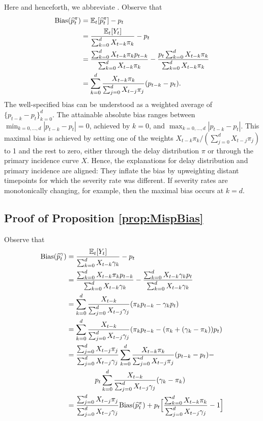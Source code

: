 \documentclass{article}
\renewcommand{\hat}{\widehat} %
\newcommand{\given}{\, \vert \,}
\begin{document}
Here and henceforth, we abbreviate \smash{$\E_t[\cdot] = \E[\cdot \given
  \{X_s\}_{s\leq t}]$}. Observe that
    \begin{align*}%
    \text{Bias}(\hat{p}_t^\pi) &= \E_t[\hat{p}_t^\pi] - p_t \\
    &= \frac{\E_t[Y_t]}{\sum_{k=0}^d X_{t-k}\pi_k} - p_t \\ 
    &= \frac{\sum_{k=0}^d X_{t-k}\pi_k p_{t-k}}{\sum_{k=0}^d X_{t-k}\pi_k} - \frac{p_t \sum_{k=0}^d X_{t-k}\pi_k}{\sum_{k=0}^d X_{t-k}\pi_k}\\
    &= \sum_{k=0}^d \frac{X_{t-k}\pi_k}{\sum_{j=0}^d X_{t-j}\pi_j} (p_{t-k}-p_t).
\end{align*}
The well-specified bias can be understood as a weighted average of $\{p_{t-k}-p_t\}_{k=0}^d$. The attainable absolute bias ranges between $\min_{k=0, \dotsc, d} |p_{t-k}-p_t| = 0$, achieved by $k=0$, and $\max_{k=0, \dotsc, d} |p_{t-k}-p_t|$. This maximal bias is achieved by setting one of the weights
$X_{t-k}\pi_k/(\sum_{j=0}^d X_{t-j}\pi_j)$ to 1 and the rest to zero,
either through the delay distribution $\pi$ or through the primary incidence curve $X$. Hence, the explanations for delay distribution and primary incidence are aligned: They inflate the bias by upweighting distant timepoints for which the severity rate was different. If severity rates are monotonically changing, for example, then the maximal bias occurs at $k=d$. 

\subsection{Proof of Proposition \ref{prop:MispBias}}
\label{apx:MispBias}

Observe that
    \begin{align*}
    \text{Bias}(\hat{p}_t^\gamma) &= \frac{\E_t[Y_t]}{\sum_{k=0}^d X_{t-k}\gamma_k} - p_t \\
    &= \frac{\sum_{k=0}^d X_{t-k}\pi_k p_{t-k}}{\sum_{k=0}^d X_{t-k}\gamma_k} - \frac{\sum_{k=0}^d X_{t-k}\gamma_k p_t}{\sum_{k=0}^d X_{t-k}\gamma_k} \\
    &= \sum_{k=0}^d \frac{X_{t-k}}{\sum_{j=0}^d X_{t-j}\gamma_j}(\pi_k p_{t-k}-\gamma_k p_t) \\
    &= \sum_{k=0}^d \frac{X_{t-k}}{\sum_{j=0}^d X_{t-j}\gamma_j}(\pi_k p_{t-k}-(\pi_k +(\gamma_k-\pi_k)) p_t) \\
     &= \frac{\sum_{j=0}^d X_{t-j}\pi_j}{\sum_{j=0}^d X_{t-j}\gamma_j}\sum_{k=0}^d \frac{X_{t-k}\pi_k}{\sum_{j=0}^d X_{t-j}\pi_j}(p_{t-k}-p_t) -\\
     &\qquad\qquad p_t\sum_{k=0}^d \frac{X_{t-k}}{\sum_{j=0}^d X_{t-j}\gamma_j}(\gamma_k -\pi_k)  \\
     &= \frac{\sum_{j=0}^d X_{t-j}\pi_j}{\sum_{j=0}^d X_{t-j}\gamma_j}\text{Bias}(\hat{p}_t^\pi) + p_t\Big[ \frac{\sum_{k=0}^d X_{t-k}\pi_k}{\sum_{j=0}^d X_{t-j}\gamma_j}-1\Big]
\end{align*}
\end{document}

